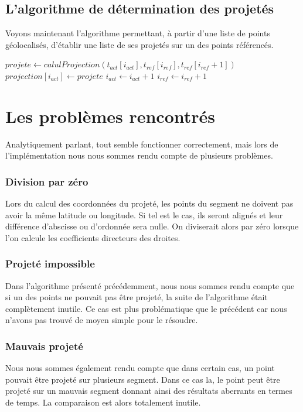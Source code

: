 \subsection{L'algorithme de détermination des projetés}
Voyons maintenant l'algorithme permettant, à partir d'une liste de points géolocalisés, d'établir une liste de ses projetés sur un des points référencés.
\begin{algorithmic}
	\State $projete \gets calulProjection(t_{act}[i_{act}],t_{ref}[i_{ref}],t_{ref}[i_{ref}+1])$
    	\State $projection[i_{act}]\gets projete$
    	\State $i_{act}\gets i_{act}+1$
   	\Else
   		\State $i_{ref}\gets i_{ref}+1$
    \EndIf

\EndWhile
\EndFunction
\end{algorithmic}

\section{Les problèmes rencontrés}
Analytiquement parlant, tout semble fonctionner correctement, mais lors de l'implémentation nous nous sommes rendu compte de plusieurs problèmes. 

\subsubsection{Division par zéro}
Lors du calcul des coordonnées du projeté, les points du segment ne doivent pas avoir la même latitude ou longitude. Si tel est le cas, ils seront alignés et leur différence d'abscisse ou d'ordonnée sera nulle. On diviserait alors par zéro lorsque l'on calcule les coefficients directeurs des droites.

\subsubsection{Projeté impossible}
Dans l'algorithme présenté précédemment, nous nous sommes rendu compte que si un des points ne pouvait pas être projeté, la suite de l'algorithme était complètement inutile. Ce cas est plus problématique que le précédent car nous n’avons pas trouvé de moyen simple pour le résoudre.

\subsubsection{Mauvais projeté}
Nous nous sommes également rendu compte que dans certain cas, un point pouvait être projeté sur plusieurs segment. Dans ce cas la, le point peut être projeté sur un mauvais segment donnant ainsi des résultats aberrants en termes de temps. La comparaison est alors totalement inutile.